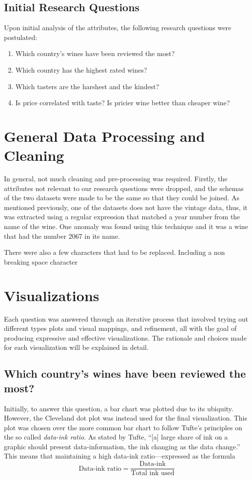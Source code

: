 \subsection{Initial Research Questions}
Upon initial analysis of the attributes, the following research questions were postulated:
\begin{enumerate}
    \setlength\itemsep{0.1em}
    \item Which country's wines have been reviewed the most?
    \item Which country has the highest rated wines?
    \item Which tasters are the harshest and the kindest?
    \item Is price correlated with taste? Is pricier wine better than cheaper wine?
\end{enumerate}

\section{General Data Processing and Cleaning}
In general, not much cleaning and pre-processing was required. Firstly, the attributes not relevant to our research questions were dropped, and the schemas of the two datasets were made to be the same so that they could be joined. As mentioned previously, one of the datasets does not have the vintage data, thus, it was extracted using a regular expression that matched a year number from the name of the wine. One anomaly was found using this technique and it was a wine that had the number 2067 in its name.

There were also a few characters that had to be replaced. Including a non breaking space character 

\section{Visualizations}
Each question was answered through an iterative process that involved trying out different types plots and visual mappings, and refinement, all with the goal of producing expressive and effective visualizations. The rationale and choices made for each visualization will be explained in detail.

\subsection{Which country's wines have been reviewed the most?}
Initially, to answer this question, a bar chart was plotted due to its ubiquity. However, the Cleveland dot plot was instead used for the final visualization. This plot was chosen over the more common bar chart to follow Tufte's principles on the so called \emph{data-ink ratio}. As stated by Tufte, ``[a] large share of ink on a graphic should present data-information, the ink changing as the data change.'' This means that maintaining a high data-ink ratio---expressed as the formula
$$
\textrm{Data-ink ratio} = \frac{\textrm{Data-ink}}{\textrm{Total ink used}}
$$

